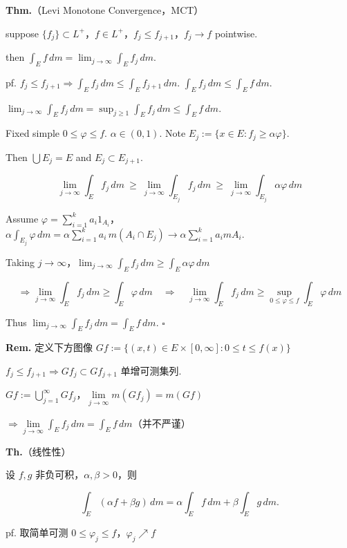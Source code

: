 \documentclass[11pt]{ctexart}
\theoremstyle{definition}
\begin{document}
\textbf{Thm.}（Levi Monotone Convergence，MCT）

suppose $\{f_j\} \subset L^+$，$f \in L^+$，$f_j \leq f_{j+1}$，$f_j \to f$  pointwise.

then $\displaystyle\int_E f \, dm = \lim_{j \to \infty} \int_E f_j \, dm$.

pf. $f_j \leq f_{j+1} \Rightarrow \int_E f_j \, dm \leq \int_E f_{j+1} \, dm$. $\int_E f_j \, dm \leq \int_E f \, dm$.

$\displaystyle\lim_{j \to \infty} \int_E f_j \, dm = \sup_{j \geq 1} \int_E f_j \, dm \leq \int_E f \, dm$.

Fixed simple $0 \leq \varphi \leq f$. $\alpha \in (0, 1)$. Note $E_j := \{x \in E : f_j \geq \alpha \varphi\}$.

Then $\bigcup E_j = E$ and $E_j \subset E_{j+1}$.

\[
\lim_{j \to \infty} \int_E f_j \, dm \ \geq\ \lim_{j \to \infty} \int_{E_j} f_j \, dm \ \geq\ \lim_{j \to \infty} \int_{E_j} \alpha \varphi \, dm
\]

Assume $\varphi = \sum\limits_{i=1}^{k} a_i 1_{A_i}$，$\alpha \int_{E_j} \varphi \, dm = \alpha \sum\limits_{i=1}^{k} a_i\, m(A_i \cap E_j) \to \alpha \sum\limits_{i=1}^{k} a_i mA_i$.

Taking $j \to \infty$，$\displaystyle\lim_{j \to \infty} \int_E f_j \, dm \geq \int_E \alpha \varphi \, dm$

\[
\Rightarrow \lim_{j \to \infty} \int_E f_j \, dm \geq \int_E \varphi \, dm \quad \Rightarrow \quad \lim_{j \to \infty} \int_E f_j \, dm \geq \sup_{0 \leq \varphi \leq f} \int_E \varphi \, dm
\]

Thus $\displaystyle\lim_{j \to \infty} \int_E f_j \, dm = \int_E f \, dm$. $\square$

\textbf{Rem.} 定义下方图像 $Gf := \{(x, t) \in E \times [0, \infty] : 0 \leq t \leq f(x)\}$

$f_j \leq f_{j+1} \Rightarrow Gf_j \subset Gf_{j+1}$ 单增可测集列.

$Gf := \bigcup\limits_{j=1}^{\infty} Gf_j$，$\lim\limits_{j \to \infty} m(Gf_j) = m(Gf)$

$\Rightarrow \lim\limits_{j \to \infty} \int_E f_j \, dm = \int_E f \, dm$（并不严谨）

\textbf{Th.}（线性性）

设 $f, g$ 非负可积，$\alpha, \beta > 0$，则

\[
\int_E (\alpha f + \beta g)\, dm = \alpha \int_E f\, dm + \beta \int_E g\, dm.
\]

pf. 取简单可测 $0 \leq \varphi_j \leq f$，$\varphi_j \nearrow f$
\end{document}
